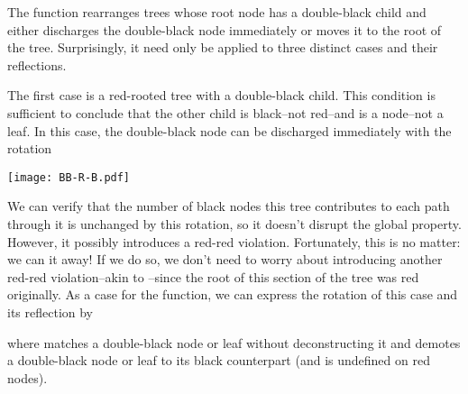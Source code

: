 \documentclass[preprint]{sigplanconf}
\begin{document}
The  function rearranges trees whose root node has a double-black child and either discharges the double-black node immediately or moves it to the root of the tree. Surprisingly, it need only be applied to three distinct cases and their reflections.

The first case is a red-rooted tree with a double-black child. This condition is sufficient to conclude that the other child is black--not red--and is a node--not a leaf. In this case, the double-black node can be discharged immediately with the rotation
\begin{center}
\texttt{[image: BB-R-B.pdf]}
\end{center}
We can verify that the number of black nodes this tree contributes to each path through it is unchanged by this rotation, so it doesn't disrupt the global property. However, it possibly introduces a red-red violation. Fortunately, this is no matter: we can  it away! If we do so, we don't need to worry about introducing another red-red violation--akin to --since the root of this section of the tree was red originally. As a case for the  function, we can express the rotation of this case and its reflection by
\begin{schemedisplay}
[(R (BB? a-x-b) y (B c z d))
 (balance (B (R (-B a-x-b) y c) z d))]
[(R (B a x b) y (BB? c-z-d))
 (balance (B a x (R b y (-B c-z-d))))]
\end{schemedisplay}
where  matches a double-black node or leaf without deconstructing it and  demotes a double-black node or leaf to its black counterpart (and is undefined on red nodes).
\end{document}
